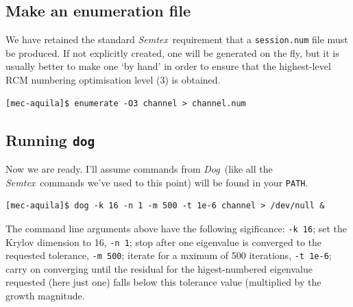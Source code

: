 \documentclass[11pt,a4paper]{report}
\newcommand{\Semtex}{\emph{Semtex}}
\newcommand{\Dog}{\emph{Dog}}
\begin{document}
\subsection{Make an enumeration file}

We have retained the standard \Semtex\ requirement that a
\verb+session.num+ file must be produced. If not explicitly created,
one will be generated on the fly, but it is usually better to make one
`by hand' in order to ensure that the highest-level RCM numbering
optimisation level (3) is obtained.  {\small
\begin{verbatim}
[mec-aquila]$ enumerate -O3 channel > channel.num
\end{verbatim}
}

\subsection{Running \texttt{dog}}

Now we are ready. I'll assume commands from \Dog\ (like all the
\Semtex\ commands we've used to this point) will be found in your
\texttt{PATH}.
{\small
\begin{verbatim}
[mec-aquila]$ dog -k 16 -n 1 -m 500 -t 1e-6 channel > /dev/null &
\end{verbatim}
}The command line arguments above have the following sigificance:
\verb+-k 16+; set the Krylov dimension to 16, \verb+-n 1+; stop after
one eigenvalue is converged to the requested tolerance,
\verb+-m 500+; iterate for a mximum of 500 iterations, \verb+-t 1e-6+;
carry on converging until the residual for the higest-numbered
eigenvalue requested (here just one) falls below this tolerance value
(multiplied by the growth magnitude.
\end{document}
